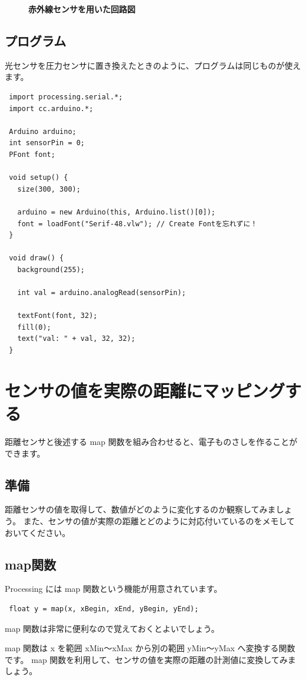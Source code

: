 \documentclass[11pt,a4paper]{jarticle}
\begin{document}
\begin{figure}[h!]
\begin{minipage}{0.5\columnwidth}
  \begin{center}
   \textbf{赤外線センサを用いた回路図}
  \end{center}
 \end{minipage}
\end{figure}


\subsection*{プログラム}
光センサを圧力センサに置き換えたときのように、プログラムは同じものが使えます。
\begin{lstlisting}
 import processing.serial.*;
 import cc.arduino.*;
 
 Arduino arduino;
 int sensorPin = 0;
 PFont font;
 
 void setup() {
   size(300, 300);

   arduino = new Arduino(this, Arduino.list()[0]); 
   font = loadFont("Serif-48.vlw"); // Create Fontを忘れずに！
 }

 void draw() {
   background(255);

   int val = arduino.analogRead(sensorPin);

   textFont(font, 32);
   fill(0);
   text("val: " + val, 32, 32);
 }
\end{lstlisting}


\section{センサの値を実際の距離にマッピングする}
距離センサと後述する map 関数を組み合わせると、電子ものさしを作ることができます。

\subsection*{準備}
距離センサの値を取得して、数値がどのように変化するのか観察してみましょう。
また、センサの値が実際の距離とどのように対応付いているのをメモしておいてください。

\subsection*{map関数}
Processing には map 関数という機能が用意されています。
\begin{lstlisting}
 float y = map(x, xBegin, xEnd, yBegin, yEnd);
\end{lstlisting}
map 関数は非常に便利なので覚えておくとよいでしょう。

map 関数は x を範囲 xMin〜xMax から別の範囲 yMin〜yMax へ変換する関数です。
map 関数を利用して、センサの値を実際の距離の計測値に変換してみましょう。
\end{document}
